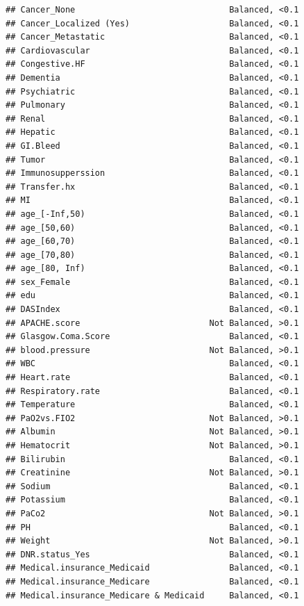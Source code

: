 \documentclass[
]{book}
\begin{document}
\begin{verbatim}
## Cancer_None                               Balanced, <0.1
## Cancer_Localized (Yes)                    Balanced, <0.1
## Cancer_Metastatic                         Balanced, <0.1
## Cardiovascular                            Balanced, <0.1
## Congestive.HF                             Balanced, <0.1
## Dementia                                  Balanced, <0.1
## Psychiatric                               Balanced, <0.1
## Pulmonary                                 Balanced, <0.1
## Renal                                     Balanced, <0.1
## Hepatic                                   Balanced, <0.1
## GI.Bleed                                  Balanced, <0.1
## Tumor                                     Balanced, <0.1
## Immunosupperssion                         Balanced, <0.1
## Transfer.hx                               Balanced, <0.1
## MI                                        Balanced, <0.1
## age_[-Inf,50)                             Balanced, <0.1
## age_[50,60)                               Balanced, <0.1
## age_[60,70)                               Balanced, <0.1
## age_[70,80)                               Balanced, <0.1
## age_[80, Inf)                             Balanced, <0.1
## sex_Female                                Balanced, <0.1
## edu                                       Balanced, <0.1
## DASIndex                                  Balanced, <0.1
## APACHE.score                          Not Balanced, >0.1
## Glasgow.Coma.Score                        Balanced, <0.1
## blood.pressure                        Not Balanced, >0.1
## WBC                                       Balanced, <0.1
## Heart.rate                                Balanced, <0.1
## Respiratory.rate                          Balanced, <0.1
## Temperature                               Balanced, <0.1
## PaO2vs.FIO2                           Not Balanced, >0.1
## Albumin                               Not Balanced, >0.1
## Hematocrit                            Not Balanced, >0.1
## Bilirubin                                 Balanced, <0.1
## Creatinine                            Not Balanced, >0.1
## Sodium                                    Balanced, <0.1
## Potassium                                 Balanced, <0.1
## PaCo2                                 Not Balanced, >0.1
## PH                                        Balanced, <0.1
## Weight                                Not Balanced, >0.1
## DNR.status_Yes                            Balanced, <0.1
## Medical.insurance_Medicaid                Balanced, <0.1
## Medical.insurance_Medicare                Balanced, <0.1
## Medical.insurance_Medicare & Medicaid     Balanced, <0.1

\end{verbatim}
\end{document}
